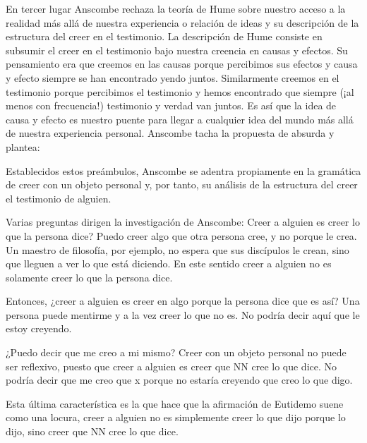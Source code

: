 En tercer lugar Anscombe rechaza la teoría de Hume sobre nuestro acceso a la
realidad más allá de nuestra experiencia o relación de ideas y su descripción de
la estructura del creer en el testimonio. La descripción de Hume consiste en
subsumir el creer en el testimonio bajo nuestra creencia en causas y efectos. Su
pensamiento era que creemos en las causas porque percibimos sus efectos y causa
y efecto siempre se han encontrado yendo juntos. Similarmente creemos en el
testimonio porque percibimos el testimonio y hemos encontrado que siempre (¡al
menos con frecuencia!) testimonio y verdad van juntos. Es así que la idea de
causa y efecto es nuestro puente para llegar a cualquier idea del mundo más allá
de nuestra experiencia personal. Anscombe tacha la propuesta de absurda y
plantea: 

Establecidos estos preámbulos, Anscombe se adentra propiamente en la gramática
de creer con un objeto personal y, por tanto, su análisis de la estructura del
creer el testimonio de alguien.

Varias preguntas dirigen la investigación de Anscombe:
Creer a alguien es creer lo que la persona dice?
Puedo creer algo que otra persona cree, y no porque le crea. Un maestro de
filosofía, por ejemplo, no espera que sus discípulos le crean, sino que lleguen
a ver lo que está diciendo. En este sentido creer a alguien no es solamente
creer lo que la persona dice.

Entonces, ¿creer a alguien es creer en algo porque la persona dice que es así?
Una persona puede mentirme y a la vez creer lo que no es. No podría decir aquí
que le estoy creyendo.

¿Puedo decir que me creo a mi mismo? Creer con un objeto personal no puede ser
reflexivo, puesto que creer a alguien es creer que NN cree lo que dice. No
podría decir que me creo que x porque no estaría creyendo que creo lo que digo.

Esta última característica es la que hace que la afirmación de Eutidemo suene
como una locura, creer a alguien no es simplemente creer lo que dijo porque lo
dijo, sino creer que NN cree lo que dice.
